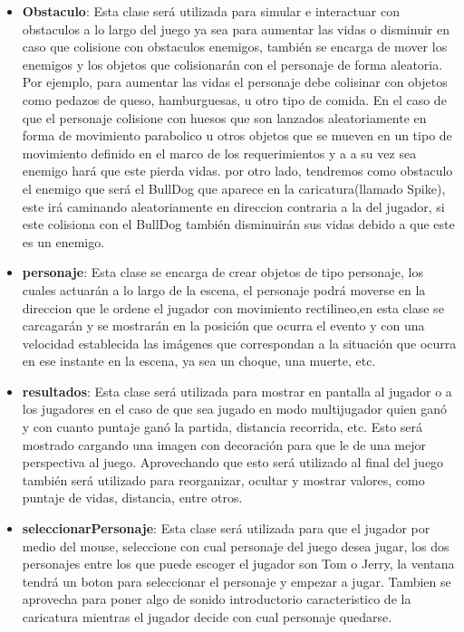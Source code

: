 \documentclass{article}
\begin{document}
\begin{itemize}
\item\noindent\textbf{Obstaculo}: 
Esta clase será utilizada para simular e interactuar con obstaculos a lo largo del juego ya sea para aumentar las vidas o disminuir en caso que colisione con obstaculos enemigos, también se encarga de mover los enemigos y los objetos que colisionarán con el personaje de forma aleatoria. 
Por ejemplo, para aumentar las vidas el personaje debe colisinar con objetos como pedazos de queso, hamburguesas, u otro tipo de comida.
En el caso de que el personaje colisione con huesos que son lanzados aleatoriamente en forma de movimiento parabolico u otros objetos que se mueven en un tipo de movimiento definido en el marco de los requerimientos y a a su vez sea enemigo hará que este pierda vidas.
por otro lado,  tendremos como obstaculo el enemigo que será el BullDog que aparece en la caricatura(llamado Spike), este irá caminando aleatoriamente en direccion contraria a la del jugador, si este colisiona con el BullDog también disminuirán sus vidas debido a que este es un enemigo.\\
 
 
\item\noindent\textbf{personaje}:
Esta clase se encarga de crear objetos de tipo personaje, los cuales actuarán a lo largo de la escena, el personaje podrá moverse en la direccion que le ordene el jugador con movimiento rectilineo,en esta clase se carcagarán y se mostrarán en la posición que ocurra el evento y con una velocidad establecida las imágenes que correspondan a la situación que ocurra en ese instante en la escena, ya sea un choque, una muerte, etc.\\ 

\item\noindent\textbf{resultados}:
Esta clase será utilizada para mostrar en pantalla al jugador o a  los jugadores en el caso de que sea jugado en modo multijugador quien ganó y con cuanto puntaje ganó la partida, distancia recorrida, etc. Esto será mostrado cargando una imagen con decoración para que le de una mejor perspectiva al juego. Aprovechando que esto será utilizado al final del juego también será utilizado para reorganizar, ocultar y mostrar valores, como puntaje de vidas, distancia, entre otros.\\
 
\item\noindent\textbf{seleccionarPersonaje}:
Esta clase será utilizada para que el jugador por medio del mouse, seleccione con cual personaje del juego desea jugar, los dos personajes entre los que puede escoger el jugador son Tom o Jerry, la ventana tendrá un boton para seleccionar el personaje y empezar a jugar. Tambien se aprovecha para poner algo de sonido introductorio caracteristico de la caricatura mientras el jugador decide con cual personaje quedarse. \\
\end{itemize}
\end{document}
